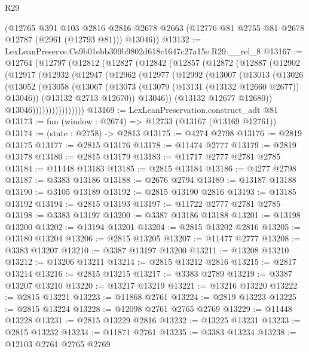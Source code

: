 \begin{lexlean}{R29}
\begin{coremodule}
      (@12765
        @391
        @103
        @2816
        @2816
        @2678
        @2663
        (@12776 @81 @2755 @81 @2678 @12787 (@2961 (@12793 @81)))
        @13046))
@13132 := LexLeanPreserve.Ce9b01ebb309b9802d618c1647c27a15e.R29.__rel_8
@13167 := @12764
    (@12797
      (@12812
        (@12827
          (@12842
            (@12857
              (@12872
                (@12887
                  (@12902
                    (@12917
                      (@12932
                        (@12947
                          (@12962
                            (@12977
                              (@12992
                                (@13007
                                  (@13013
                                    (@13026
                                      (@13052
                                        (@13058
                                          (@13067
                                            (@13073 (@13079 (@13131 (@13132 @12660 @2677)) @13046))
                                            (@13132 @2713 @12670))
                                          @13046))
                                      (@13132 @12677 @12680))
                                    @13046))))))))))))))))
@13169 := LexLeanPreservation.construct_adt @81
@13173 := fun (window : @2674) => @12733 (@13167 (@13169 @12761))
@13174 := (state : @2758) -> @2813
@13175 := @4274 @2798
@13176 := @2819 @13175
@13177 := @2815 @13176
@13178 := @11474 @2777
@13179 := @2819 @13178
@13180 := @2815 @13179
@13183 := @11717 @2777 @2781 @2785
@13184 := @11448 @13183
@13185 := @2815 @13184
@13186 := @4277 @2798
@13187 := @3383 @13186
@13188 := @2676 @2794
@13189 := @13187 @13188
@13190 := @3105 @13189
@13192 := @2815 @13190 @2816
@13193 := @13185 @13192
@13194 := @2815 @13193
@13197 := @11722 @2777 @2781 @2785
@13198 := @3383 @13197
@13200 := @3387 @13186 @13188
@13201 := @13198 @13200
@13202 := @13194 @13201
@13204 := @2815 @13202 @2816
@13205 := @13180 @13204
@13206 := @2815 @13205
@13207 := @11477 @2777
@13208 := @3383 @13207
@13210 := @3387 @13197 @13200
@13211 := @13208 @13210
@13212 := @13206 @13211
@13214 := @2815 @13212 @2816
@13215 := @2817 @13214
@13216 := @2815 @13215
@13217 := @3383 @2789
@13219 := @3387 @13207 @13210
@13220 := @13217 @13219
@13221 := @13216 @13220
@13222 := @2815 @13221
@13223 := @11868 @2761
@13224 := @2819 @13223
@13225 := @2815 @13224
@13228 := @12098 @2761 @2765 @2769
@13229 := @11448 @13228
@13231 := @2815 @13229 @2816
@13232 := @13225 @13231
@13233 := @2815 @13232
@13234 := @11871 @2761
@13235 := @3383 @13234
@13238 := @12103 @2761 @2765 @2769

\end{coremodule}
\end{lexlean}
